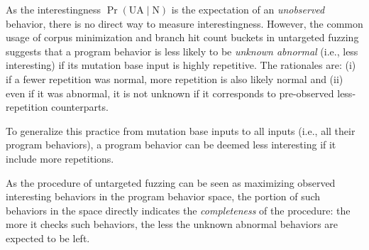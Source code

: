 \documentclass[letterpaper,twocolumn,10pt]{article}
\begin{document}
%
As the interestingness $\Pr(\mathrm{UA} \mid \mathrm{N})$ is the expectation of
an \emph{unobserved} behavior, there is no direct way to measure
interestingness. 
%
However, the common usage of corpus minimization \cite{todo} and branch hit
count buckets \cite{todo} in untargeted fuzzing suggests that a program behavior
is less likely to be \emph{unknown abnormal} (i.e., less interesting) if its
mutation base input is highly repetitive.
%
The rationales are: (i) if a fewer repetition was normal,
more repetition is also likely normal and (ii) even if it was abnormal, it is 
not unknown if it corresponds to pre-observed less-repetition counterparts. 

To generalize this practice from mutation base inputs to all inputs (i.e., all
their program behaviors), a program behavior can be deemed less interesting if
it include more repetitions.

%
%




%
As the procedure of untargeted fuzzing can be seen as maximizing observed
interesting behaviors in the program behavior space, the portion of such 
behaviors in the space directly indicates the \emph{completeness} of the
procedure: the more it checks such behaviors, the less the unknown
abnormal behaviors are expected to be left.
\end{document}
